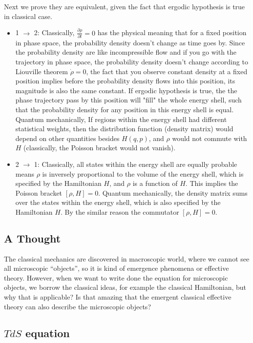 \documentclass[10pt]{article}
\begin{document}
Next we prove they are equivalent, given the fact that ergodic hypothesis is true in classical case.
\begin{itemize}
	\item 1 $\to$ 2: Classically, $\frac{\partial \rho}{\partial t} = 0$ has the physical meaning that for a fixed position in phase space, the probability density doesn't change as time goes by. Since the probability density are like incompressible flow and if you go with the trajectory in phase space, the probability density doesn't change according to Liouville theorem $\dot{\rho} =0$, the fact that you observe constant density at a fixed position implies before the probability density flows into this position, its magnitude is also the same constant. If ergodic hypothesis is true, the the phase trajectory pass by this position will "fill" the whole energy shell, such that the probability density for any position in this energy shell is equal. Quantum mechanically, If regions within the energy shell had different statistical weights, then the distribution function (density matrix) would depend on other quantities besides $H(q,p)$, and $\rho$ would not commute with $H$ (classically, the Poisson bracket would not vanish).

	\item 2 $\to$ 1: Classically, all states within the energy shell are equally probable means $\rho$ is inversely proportional to the volume of the energy shell, which is specified by the Hamiltonian $H$, and $\rho$ is a function of $H$. This implies the Poisson bracket $[\rho, H] = 0$. Quantum mechanically, the density matrix sums over the states within the energy shell, which is also specified by the Hamiltonian $H$. By the similar reason the commutator $[\rho, H] = 0$.
\end{itemize}

\subsection{A Thought}

The classical mechanics are discovered in macroscopic world, where we cannot see all microscopic ``objects'', so it is kind of emergence phenomena or effective theory. However, when we want to write done the equation for microscopic objects, we borrow the classical ideas, for example the classical Hamiltonian, but why that is applicable? Is that amazing that the emergent classical effective theory can also describe the microscopic objects?

\subsection{$TdS$ equation}
\end{document}

